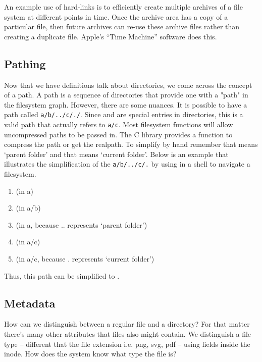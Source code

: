 An example use of hard-links is to efficiently create multiple archives of a file system at different points in time.
Once the archive area has a copy of a particular file, then future archives can re-use these archive files rather than creating a duplicate file.
Apple's ``Time Machine'' software does this.

\subsection{Pathing}

Now that we have definitions talk about directories, we come across the concept of a path.
A path is a sequence of directories that provide one with a "path" in the filesystem graph.
However, there are some nuances. It is possible to have a path called \texttt{a/b/../c/./}.
Since  and  are special entries in directories, this is a valid path that actually refers to \texttt{a/c}.
Most filesystem functions will allow uncompressed paths to be passed in.
The C library provides a function  to compress the path or get the realpath.
To simplify by hand remember that  means `parent folder' and that  means `current folder'.
Below is an example that illustrates the simplification of the \texttt{a/b/../c/.} by using  in a shell to navigate a filesystem.

\begin{enumerate}
  \item {} (in a)
  \item {} (in a/b)
  \item {} (in a, because .. represents `parent folder')
  \item {} (in a/c)
  \item {} (in a/c, because . represents `current folder')
\end{enumerate}

Thus, this path can be simplified to .

\subsection{Metadata}

How can we distinguish between a regular file and a directory?
For that matter there's many other attributes that files also might contain.
We distinguish a file type -- different that the file extension i.e. png, svg, pdf -- using fields inside the inode.
How does the system know what type the file is?

